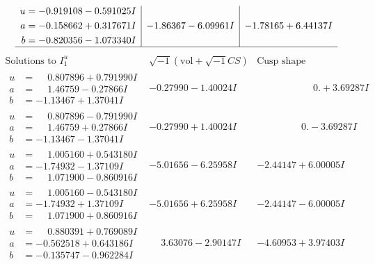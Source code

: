 \documentclass[1p]{elsarticle_modified}
\theoremstyle{definition}
\newcommand{\I}{\sqrt{-1}}
\begin{document}
$$\begin{array}{c|c|c}
\begin{aligned}
u &= -0.919108 - 0.591025 I \\
a &= -0.158662 + 0.317671 I \\
b &= -0.820356 - 1.073340 I\end{aligned}
 & -1.86367 - 6.09961 I & -1.78165 + 6.44137 I\\
 \hline 
 \end{array}$$\newpage$$\begin{array}{c|c|c}  
\text{Solutions to }I^u_{1}& \I (\text{vol} + \sqrt{-1}CS) & \text{Cusp shape}\\
 \hline 
\begin{aligned}
u &= \phantom{-}0.807896 + 0.791990 I \\
a &= \phantom{-}1.46759 - 0.27866 I \\
b &= -1.13467 + 1.37041 I\end{aligned}
 & -0.27990 - 1.40024 I & \phantom{-0.000000 -}0. + 3.69287 I \\ \hline\begin{aligned}
u &= \phantom{-}0.807896 - 0.791990 I \\
a &= \phantom{-}1.46759 + 0.27866 I \\
b &= -1.13467 - 1.37041 I\end{aligned}
 & -0.27990 + 1.40024 I & \phantom{-0.000000 } 0. - 3.69287 I \\ \hline\begin{aligned}
u &= \phantom{-}1.005160 + 0.543180 I \\
a &= -1.74932 - 1.37109 I \\
b &= \phantom{-}1.071900 - 0.860916 I\end{aligned}
 & -5.01656 - 6.25958 I & -2.44147 + 6.00005 I \\ \hline\begin{aligned}
u &= \phantom{-}1.005160 - 0.543180 I \\
a &= -1.74932 + 1.37109 I \\
b &= \phantom{-}1.071900 + 0.860916 I\end{aligned}
 & -5.01656 + 6.25958 I & -2.44147 - 6.00005 I \\ \hline\begin{aligned}
u &= \phantom{-}0.880391 + 0.769089 I \\
a &= -0.562518 + 0.643186 I \\
b &= -0.135747 - 0.962284 I\end{aligned}
 & \phantom{-}3.63076 - 2.90147 I & -4.60953 + 3.97403 I \\ \hline\begin{aligned}

\end{aligned}
\end{array}$$
\end{document}
